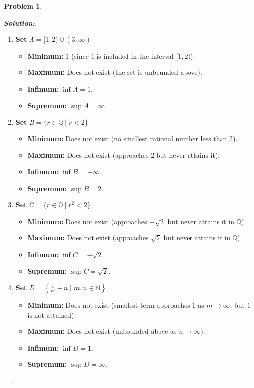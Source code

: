 \documentclass[12pt]{article}
\theoremstyle{definition}\newtheorem{problem}{Problem}
\newenvironment{solution}{\begin{proof}[\bfseries\textup{Solution:}]}{\end{proof}}
\begin{document}
\newpage
\begin{problem}
\end{problem}
\begin{solution}

\begin{enumerate}
    \item \textbf{Set} \( A = [1,2) \cup (3,\infty) \)
    \begin{itemize}
        \item \textbf{Minimum:} \( 1 \) (since \( 1 \) is included in the interval \([1,2)\)).
        \item \textbf{Maximum:} Does not exist (the set is unbounded above).
        \item \textbf{Infimum:} \( \inf A = 1 \).
        \item \textbf{Supremum:} \( \sup A = \infty \).
    \end{itemize}

    \item \textbf{Set} \( B = \{ r \in \mathbb{Q} \mid r < 2 \} \)
    \begin{itemize}
        \item \textbf{Minimum:} Does not exist (no smallest rational number less than 2).
        \item \textbf{Maximum:} Does not exist (approaches \( 2 \) but never attains it).
        \item \textbf{Infimum:} \( \inf B = -\infty \).
        \item \textbf{Supremum:} \( \sup B = 2 \).
    \end{itemize}

    \item \textbf{Set} \( C = \{ r \in \mathbb{Q} \mid r^2 < 2 \} \)
    \begin{itemize}
        \item \textbf{Minimum:} Does not exist (approaches \( -\sqrt{2} \) but never attains it in \( \mathbb{Q} \)).
        \item \textbf{Maximum:} Does not exist (approaches \( \sqrt{2} \) but never attains it in \( \mathbb{Q} \)).
        \item \textbf{Infimum:} \( \inf C = -\sqrt{2} \).
        \item \textbf{Supremum:} \( \sup C = \sqrt{2} \).
    \end{itemize}

    \item \textbf{Set} \( D = \left\{ \frac{1}{m} + n \mid m,n \in \mathbb{N} \right\} \)
    \begin{itemize}
        \item \textbf{Minimum:} Does not exist (smallest term approaches \( 1 \) as \( m \to \infty \), but \( 1 \) is not attained).
        \item \textbf{Maximum:} Does not exist (unbounded above as \( n \to \infty \)).
        \item \textbf{Infimum:} \( \inf D = 1 \).
        \item \textbf{Supremum:} \( \sup D = \infty \).
    \end{itemize}


\end{enumerate}
\end{solution}
\end{document}
